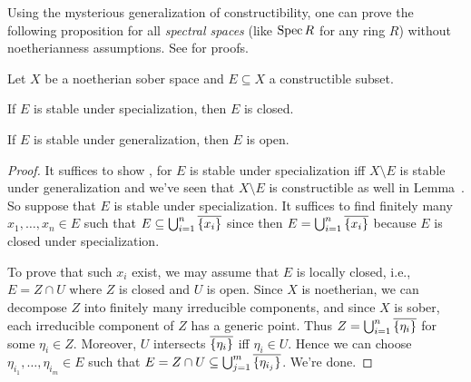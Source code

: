 \documentclass[a4paper,parskip=half,numbers=enddot, DIV=12]{scrreprt}
\begin{document}
Using the mysterious generalization of constructibility, one can prove the following proposition for all \emph{spectral spaces} (like $\operatorname{Spec} R$ for any ring $R$) without noetherianness assumptions. See \cite[]{stacks-project} for proofs.
\begin{prop}
	Let $X$ be a noetherian sober space and $E\subseteq X$ a constructible subset.
	\begin{alphanumerate}
		\item If $E$ is stable under specialization, then $E$ is closed.
		\item If $E$ is stable under generalization, then $E$ is open.
	\end{alphanumerate}
\end{prop}
\begin{proof}
	It suffices to show , for $E$ is stable under specialization iff $X\setminus E$ is stable under generalization and we've seen that $X\setminus E$ is constructible as well in Lemma~. So suppose that $E$ is stable under specialization. It suffices to find finitely many $x_1,\ldots,x_n\in E$ such that $E\subseteq \bigcup_{i=1}^n\overline{\{x_i\}}$ since then $E=\bigcup_{i=1}^n\overline{\{x_i\}}$ because $E$ is closed under specialization.
	
	To prove that such $x_i$ exist, we may assume that $E$ is locally closed, i.e., $E=Z\cap U$ where $Z$ is closed and $U$ is open. Since $X$ is noetherian, we can decompose $Z$ into finitely many irreducible components, and since $X$ is sober, each irreducible component of $Z$ has a generic point. Thus $Z=\bigcup_{i=1}^n\overline{\{\eta_i\}}$ for some $\eta_i\in Z$. Moreover, $U$ intersects $\overline{\{\eta_i\}}$ iff $\eta_i\in U$. Hence we can choose $\eta_{i_1},\ldots,\eta_{i_m}\in E$ such that $E=Z\cap U\subseteq \bigcup_{j=1}^m\overline{\{\eta_{i_j}\}}$. We're done.
\end{proof}
\end{document}
